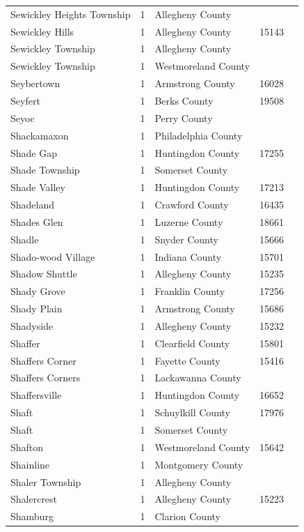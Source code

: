 \documentclass{article}
\begin{document}
\begin{tabular}{lllll}
Sewickley Heights Township & 1 & Allegheny County &  &  \\
Sewickley Hills & 1 & Allegheny County & 15143 &  \\
Sewickley Township & 1 & Allegheny County &  &  \\
Sewickley Township & 1 & Westmoreland County &  &  \\
Seybertown & 1 & Armstrong County & 16028 &  \\
Seyfert & 1 & Berks County & 19508 &  \\
Seyoc & 1 & Perry County &  &  \\
Shackamaxon & 1 & Philadelphia County &  &  \\
Shade Gap & 1 & Huntingdon County & 17255 &  \\
Shade Township & 1 & Somerset County &  &  \\
Shade Valley & 1 & Huntingdon County & 17213 &  \\
Shadeland & 1 & Crawford County & 16435 &  \\
Shades Glen & 1 & Luzerne County & 18661 &  \\
Shadle & 1 & Snyder County & 15666 &  \\
Shado-wood Village & 1 & Indiana County & 15701 &  \\
Shadow Shuttle & 1 & Allegheny County & 15235 &  \\
Shady Grove & 1 & Franklin County & 17256 &  \\
Shady Plain & 1 & Armstrong County & 15686 &  \\
Shadyside & 1 & Allegheny County & 15232 &  \\
Shaffer & 1 & Clearfield County & 15801 &  \\
Shaffers Corner & 1 & Fayette County & 15416 &  \\
Shaffers Corners & 1 & Lackawanna County &  &  \\
Shaffersville & 1 & Huntingdon County & 16652 &  \\
Shaft & 1 & Schuylkill County & 17976 &  \\
Shaft & 1 & Somerset County &  &  \\
Shafton & 1 & Westmoreland County & 15642 &  \\
Shainline & 1 & Montgomery County &  &  \\
Shaler Township & 1 & Allegheny County &  &  \\
Shalercrest & 1 & Allegheny County & 15223 &  \\
Shamburg & 1 & Clarion County &  &  \\

\end{tabular}
\end{document}
